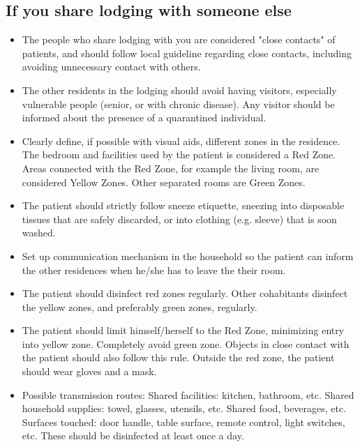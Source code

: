 \documentclass[onecolumn,journal]{IEEEtran}
\begin{document}
\begin{multicols}{2}
\section*{If you share lodging with someone else}
\begin{itemize}
\item The people who share lodging with you are considered "close contacts" of patients, and should follow local guideline regarding close contacts, including avoiding unnecessary contact with others.

\item The other residents in the lodging should avoid having visitors, especially vulnerable people (senior, or with chronic disease). Any visitor should be informed about the presence of a quarantined individual.

\item Clearly define, if possible with visual aids, different zones in the residence. The bedroom and facilities used by the patient is considered a Red Zone. Areas connected with the Red Zone, for example the living room, are considered Yellow Zones. Other separated rooms are Green Zones.

\item The patient should strictly follow sneeze etiquette, sneezing into disposable tissues that are safely discarded, or into clothing (e.g. sleeve) that is soon washed. 

\item Set up communication mechanism in the household so the patient can inform the other residences when he/she has to leave the their room. 

\item The patient should disinfect red zones regularly. Other cohabitants disinfect the yellow zones, and preferably green zones, regularly. 

\item The patient should limit himself/herself to the Red Zone, minimizing entry into yellow zone. Completely avoid green zone. Objects in close contact with the patient should also follow this rule. Outside the red zone, the patient should wear gloves and a mask.

\item Possible transmission routes: 
Shared facilities: kitchen, bathroom, etc.
Shared household supplies: towel, glasses, utensils, etc.
Shared food, beverages, etc.
Surfaces touched: door handle, table surface, remote control, light switches, etc. These should be disinfected at least once a day.


\end{itemize}
\end{multicols}
\end{document}
